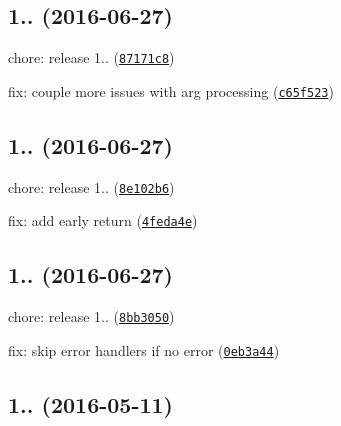 \label{_1.1.3}%
 \subsection*{
\footnotesize 1.. (2016-\/06-\/27)
\normalsize }


\begin{DoxyItemize}
\item chore\+: release 1.. (\href{https://github.com/vkarpov15/kareem/commit/87171c8}{\tt 87171c8})
\item fix\+: couple more issues with arg processing (\href{https://github.com/vkarpov15/kareem/commit/c65f523}{\tt c65f523})
\end{DoxyItemize}

\label{_1.1.2}%
 \subsection*{
\footnotesize 1.. (2016-\/06-\/27)
\normalsize }


\begin{DoxyItemize}
\item chore\+: release 1.. (\href{https://github.com/vkarpov15/kareem/commit/8e102b6}{\tt 8e102b6})
\item fix\+: add early return (\href{https://github.com/vkarpov15/kareem/commit/4feda4e}{\tt 4feda4e})
\end{DoxyItemize}

\label{_1.1.1}%
 \subsection*{
\footnotesize 1.. (2016-\/06-\/27)
\normalsize }


\begin{DoxyItemize}
\item chore\+: release 1.. (\href{https://github.com/vkarpov15/kareem/commit/8bb3050}{\tt 8bb3050})
\item fix\+: skip error handlers if no error (\href{https://github.com/vkarpov15/kareem/commit/0eb3a44}{\tt 0eb3a44})
\end{DoxyItemize}

\label{_1.1.0}%
 \subsection*{1.. (2016-\/05-\/11)}


